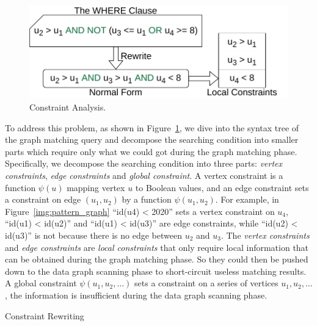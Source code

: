 \begin{figure}[ht]
  \centering
  \includegraphics[width=.4\textwidth]{img/constraints.pdf}
  \caption{Constraint Analysis.}\label{img:constraints}
\end{figure}

To address this problem, as shown in Figure~\ref{img:constraints},
we dive into the syntax tree of the graph matching query and decompose the searching condition into smaller parts which require only what we could got during the graph matching phase.
Specifically, we decompose the searching condition into three parts: \emph{vertex constraints}, \emph{edge constraints} and \emph{global constraint}.
A vertex constraint is a function $\psi(u)$ mapping vertex $u$ to Boolean values,
and an edge constraint sets a constraint on edge $(u_1, u_2)$ by a function $\psi(u_1, u_2)$.
For example, in Figure~\ref{img:pattern_graph} ``{id(u4) < 2020}'' sets a vertex constraint on $u_4$,
``{id(u1) < id(u2)}'' and ``{id(u1) < id(u3)}'' are edge constraints,
while ``{id(u2) < id(u3)}'' is not because there is no edge between $u_2$ and $u_3$.
The \emph{vertex constraints} and \emph{edge constraints} are \emph{local constraints} that only require local information that can be obtained during the graph matching phase.
So they could then be pushed down to the data graph scanning phase to short-circuit useless matching results.
A global constraint $\psi(u_1, u_2, \dots)$ sets a constraint on a series of vertices $u_1, u_2, \dots$,
the information is insufficient during the data graph scanning phase.

\begin{algorithm}[ht]
  \caption{Constraint Rewriting}\label{alg:rewrite}
\end{algorithm}

